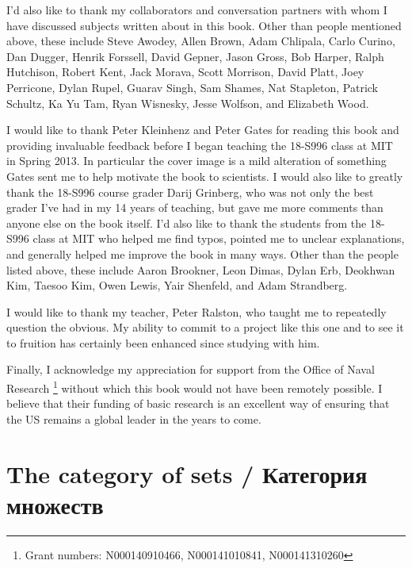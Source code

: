 \documentclass[a4paper]{book}
\theoremstyle{myth}
\begin{document}
\begin{russian}
 

I'd also like to thank my collaborators and conversation partners with whom I have discussed subjects written about in this book. Other than people mentioned above, these include Steve Awodey, Allen Brown, Adam Chlipala, Carlo Curino, Dan Dugger, Henrik Forssell, David Gepner, Jason Gross, Bob Harper, Ralph Hutchison, Robert Kent, Jack Morava, Scott Morrison, David Platt, Joey Perricone, Dylan Rupel, Guarav Singh, Sam Shames, Nat Stapleton, Patrick Schultz, Ka Yu Tam, Ryan Wisnesky, Jesse Wolfson, and Elizabeth Wood.

 

I would like to thank Peter Kleinhenz and Peter Gates for reading this book and providing invaluable feedback before I began teaching the 18-S996 class at MIT in Spring 2013. In particular the cover image is a mild alteration of something Gates sent me to help motivate the book to scientists. I would also like to greatly thank the 18-S996 course grader Darij Grinberg, who was not only the best grader I've had in my 14 years of teaching, but gave me more comments than anyone else on the book itself. I'd also like to thank the students from the 18-S996 class at MIT who helped me find typos, pointed me to unclear explanations, and generally helped me improve the book in many ways. Other than the people listed above, these include Aaron Brookner, Leon Dimas, Dylan Erb, Deokhwan Kim, Taesoo Kim, Owen Lewis, Yair Shenfeld, and Adam Strandberg.

 

I would like to thank my teacher, Peter Ralston, who taught me to repeatedly question the obvious. My ability to commit to a project like this one and to see it to fruition has certainly been enhanced since studying with him.

 

Finally, I acknowledge my appreciation for support from the Office of Naval Research%
\footnote{Grant numbers: N000140910466, N000141010841, N000141310260}
without which this book would not have been remotely possible. I believe that their funding of basic research is an excellent way of ensuring that the US remains a global leader in the years to come.

 



\chapter{The category of sets / Категория множеств}\label{chap:sets}


\end{russian}
\end{document}
